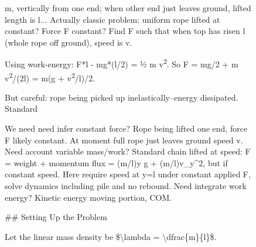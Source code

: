 \begin{figure}[t]
\begin{reasoncol}[equal height group=reasX4]
  \par\vspace{1pt}
  \caret{}\par\vspace{4pt}
  \raggedright {}  m, vertically from one end; when other end just leaves ground, lifted length is l... Actually classic problem: uniform rope lifted at constant? Force F constant? Find F such that when top has risen l (whole rope off ground), speed is v.\par
  Using work-energy: F*l - mg*(l/2) = ½ m v\textsuperscript{2}. So F = mg/2 + m v\textsuperscript{2}/(2l) = m(g + v\textsuperscript{2}/l)/2.\par
  But careful: rope being picked up inelastically--energy dissipated. Standard\par\vspace{3pt}\elide
\end{reasoncol}\hspace{\columnsep}%
\begin{reasoncol}[equal height group=reasX4]
  \par\vspace{1pt}
  \caret{}\par\vspace{4pt}
  \raggedright We need need infer constant force? Rope being lifted one end, force F likely constant. At moment full rope just leaves ground speed v. Need account variable mass/work? Standard chain lifted at speed: F = weight + momentum flux = (m/l)y g + (m/l)v\_y\textasciicircum{}2, but if constant speed. Here require speed at y=l under constant applied F, solve dynamics including pile and no rebound. Need integrate work energy? Kinetic energy moving portion, COM.\par\vspace{3pt}\elide
\end{reasoncol}\par
\vspace{12pt}
\noindent
\begin{answercol}[equal height group=ansX4]
  \caret{}\par\vspace{4pt}
  \raggedright \#\# Setting Up the Problem\par\vspace{2pt}
  Let the linear mass density be \$\textbackslash{}lambda = \textbackslash{}dfrac\{m\}\{l\}\$.\par\vspace{2pt}

\end{answercol}
\end{figure}

